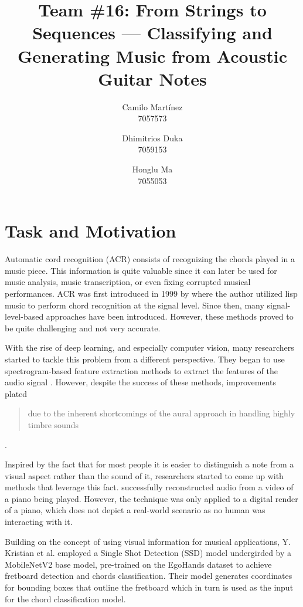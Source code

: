 \documentclass[10pt,twocolumn,letterpaper]{article}
\begin{document}
\title{Team \#16: From Strings to Sequences --- Classifying and Generating Music from Acoustic Guitar Notes}

\author{
    Camilo Martínez\\
    7057573\\
    \and
    Dhimitrios Duka\\
    7059153\\
    \and
    Honglu Ma\\
    7055053\\
}
\maketitle

\section{Task and Motivation}
Automatic cord recognition (ACR) consists of recognizing the chords played in a music piece. This information is quite valuable since it can later be used for music analysis, music transcription, or even fixing corrupted musical performances. ACR was first introduced in 1999 by \cite{takuya1999realtime} where the author utilized lisp music to perform chord recognition at the signal level. Since then, many signal-level-based approaches have been introduced. However, these methods proved to be quite challenging and not very accurate.

With the rise of deep learning, and especially computer vision, many researchers started to tackle this problem from a different perspective. They began to use spectrogram-based feature extraction methods to extract the features of the audio signal \cite{boulanger2013audio, korzeniowski2016feature, stark2009real}. However, despite the success of these methods, improvements plated \blockquote{due to the inherent shortcomings of the aural approach in handling highly timbre sounds} \cite{du2023conditional}.

Inspired by the fact that for most people it is easier to distinguish a note from a visual aspect rather than the sound of it, researchers started to come up with methods that leverage this fact. \cite{su2020audeo} successfully reconstructed audio from a video of a piano being played. However, the technique was only applied to a digital render of a piano, which does not depict a real-world scenario as no human was interacting with it.

Building on the concept of using visual information for musical applications, Y. Kristian et al. \cite{Kristian_Zaman_Tenoyo_Jodhinata_2024} employed a Single Shot Detection (SSD) model undergirded by a MobileNetV2 base model, pre-trained on the EgoHands dataset to achieve fretboard detection and chords classification. Their model generates coordinates for bounding boxes that outline the fretboard which in turn is used as the input for the chord classification model.
\end{document}

